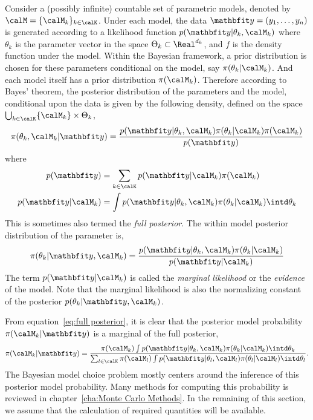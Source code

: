 Consider a (possibly infinite) countable set of parametric models, denoted by
$\calM = \{\calM_k\}_{k\in\calK}$. Under each model, the data $\data =
(y_1,\dots,y_n)$ is generated according to a likelihood function
$p(\data|\theta_k,\calM_k)$ where $\theta_k$ is the parameter vector in the
space $\Theta_k\subset\Real^{d_k}$, and $f$ is the density function under the
model. Within the Bayesian framework, a prior distribution is chosen for these
parameters conditional on the model, say $\pi(\theta_k|\calM_k)$. And each
model itself has a prior distribution $\pi(\calM_k)$. Therefore according to
Bayes' theorem, the posterior distribution of the parameters and the model,
conditional upon the data is given by the following density, defined on the
space $\bigcup_{k\in\calK}\{\calM_k\}\times\Theta_k$,
\begin{equation}
  \pi(\theta_k,\calM_k|\data) =
  \frac{p(\data|\theta_k,\calM_k)\pi(\theta_k|\calM_k)\pi(\calM_k)}{p(\data)}
  \label{eq:full posterior}
\end{equation}
where
\begin{align}
  p(\data) &= \sum_{k\in\calK}p(\data|\calM_k)\pi(\calM_k) \\
  p(\data|\calM_k) &=
  \int p(\data|\theta_k,\calM_k)\pi(\theta_k|\calM_k)\intd\theta_k
  \label{eq:marginal likelihood}
\end{align}
This is sometimes also termed the \emph{full posterior}. The within model
posterior distribution of the parameter is,
\begin{equation}
  \pi(\theta_k|\data,\calM_k) =
  \frac{p(\data|\theta_k,\calM_k)\pi(\theta_k|\calM_k)}{p(\data|\calM_k)}
  \label{eq:within posterior}
\end{equation}
The term $p(\data|\calM_k)$ is called the \emph{marginal likelihood} or the
\emph{evidence} of the model. Note that the marginal likelihood is also the
normalizing constant of the posterior $p(\theta_k|\data,\calM_k)$.

From equation~\eqref{eq:full posterior}, it is clear that the posterior model
probability $\pi(\calM_k|\data)$ is a marginal of the full posterior,
\begin{equation}
  \pi(\calM_k|\data) =
  \frac{
    \pi(\calM_k)
    \int p(\data|\theta_k,\calM_k)\pi(\theta_k|\calM_k)\intd\theta_k
  }{
    \sum_{l\in\calK}\pi(\calM_l)
    \int p(\data|\theta_l,\calM_l)\pi(\theta_l|\calM_l)\intd\theta_l
  }.
  \label{eq:post model prob}
\end{equation}
The Bayesian model choice problem mostly centers around the inference of this
posterior model probability. Many methods for computing this probability is
reviewed in chapter~\ref{cha:Monte Carlo Methods}. In the remaining of this
section, we assume that the calculation of required quantities will be
available.

